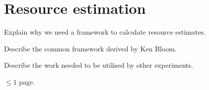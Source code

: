 \section{Resource estimation}
Explain why we need a framework to calculate resource estimates.

Describe the common framework derived by Ken Bloom.

Describe the work needed to be utilised by other experiments.

$\leq 1$ page.
